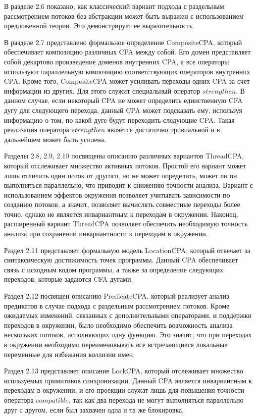 В разделе 2.6 показано, как классический вариант подхода с раздельным рассмотрением потоков без абстракции может быть выражен с использованием предложенной теории. 
Это демонстрирует ее выразительность.

В разделе 2.7 представлено формальное определение CompositeCPA, который обеспечивает композицию различных CPA между собой.
Его домен представляет собой декартово произведение доменов внутренних CPA, а все операторы используют параллельную композицию соответствующих операторов внутренних CPA.
Кроме того, CompositeCPA может усиливать переходы одних CPA за счет информации из других.
Для этого служит специальный оператор $strengthen$.
В данном случае, если некоторый CPA не может определить единственную CFA дугу для следующего перехода, данный CPA может подсказать ему, используя информацию о том, по какой дуге будут переходить следующие CPA.
Такая реализация оператора $strengthen$ является достаточно тривиальной и в дальнейшем может быть усилена.

Разделы 2.8, 2.9, 2.10 посвящены описанию различных вариантов ThreadCPA, который отслеживает множество активных потоков.
Простой его вариант может лишь отличить один поток от другого, но не может определить, может ли он выполняться параллельно, что приводит к снижению точности анализа.
Вариант с использованием эффектов окружения позволяет учитывать зависимости по созданию потоков, а значит, позволяет вычислять совместные переходы более точно, однако не является инвариантным к переходам в окружении.
Наконец, расширенный вариант ThreadCPA позволяет обеспечить необходимую точность анализа при сохранении инвариантности к переходам в окружении.

Раздел 2.11 представляет формальную модель LocationCPA, который отвечает за синтаксическую достижимость точек программы.
Данный CPA обеспечивает связь с исходным кодом программы, а также за определение следующих переходов, которые задаются CFA дугами.

Раздел 2.12 посвящен описанию PredicateCPA, который реализует анализ предикатов в случае подхода с раздельным рассмотрением потоков.
Кроме ожидаемых изменений, связанных с дополнительными операторами, и поддержки переходов в окружении, было необходимо обеспечить возможность анализа нескольких потоков, исполняющих одну функцию. 
Это значит, что при переходах в окружении необходимо переименовывать все встречающиеся локальные переменные для избежания коллизии имен.

Раздел 2.13 представляет описание LockCPA, который отслеживает множество испльзуемых примитивов синхронизации.
Данный CPA является инвариантным к переходам в окружении, и его проекции служат лишь для повышения точности оператора $compatible$, так как два перехода не могут выполняться параллельно друг с другом, если был захвачен одна и та же блокировка.

